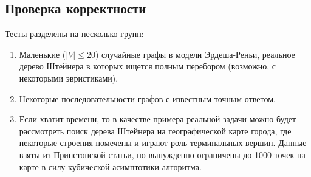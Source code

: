 \documentclass[11pt,a4paper]{report}
\def\le{\leqslant}
\theoremstyle{definition}
\theoremstyle{definition}
\theoremstyle{definition}
\begin{document}
	\subsection{Проверка корректности}
		Тесты разделены на несколько групп:
		\begin{enumerate}
			\item Маленькие ($|V| \le 20$) случайные графы в модели Эрдеша-Реньи, реальное дерево Штейнера в которых ищется полным перебором (возможно, с некоторыми эвристиками).
			\item Некоторые последовательности графов с известным точным ответом.
			\item Если хватит времени, то в качестве примера реальной задачи можно будет рассмотреть поиск дерева Штейнера на географической карте города, где некоторые строения помечены и играют роль терминальных вершин. Данные взяты из \href{https://homepage.univie.ac.at/ivana.ljubic/research/STP/}{Принстонской статьи}, но вынужденно ограничены до 1000 точек на карте в силу кубической асимптотики алгоритма.
		\end{enumerate}
\end{document}
